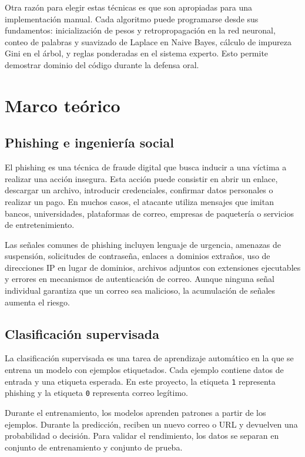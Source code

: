 \documentclass[12pt,letterpaper]{article}
\begin{document}
Otra razón para elegir estas técnicas es que son apropiadas para una implementación manual. Cada algoritmo puede programarse desde sus fundamentos: inicialización de pesos y retropropagación en la red neuronal, conteo de palabras y suavizado de Laplace en Naive Bayes, cálculo de impureza Gini en el árbol, y reglas ponderadas en el sistema experto. Esto permite demostrar dominio del código durante la defensa oral.

\section{Marco teórico}

\subsection{Phishing e ingeniería social}

El phishing es una técnica de fraude digital que busca inducir a una víctima a realizar una acción insegura. Esta acción puede consistir en abrir un enlace, descargar un archivo, introducir credenciales, confirmar datos personales o realizar un pago. En muchos casos, el atacante utiliza mensajes que imitan bancos, universidades, plataformas de correo, empresas de paquetería o servicios de entretenimiento.

Las señales comunes de phishing incluyen lenguaje de urgencia, amenazas de suspensión, solicitudes de contraseña, enlaces a dominios extraños, uso de direcciones IP en lugar de dominios, archivos adjuntos con extensiones ejecutables y errores en mecanismos de autenticación de correo. Aunque ninguna señal individual garantiza que un correo sea malicioso, la acumulación de señales aumenta el riesgo.

\subsection{Clasificación supervisada}

La clasificación supervisada es una tarea de aprendizaje automático en la que se entrena un modelo con ejemplos etiquetados. Cada ejemplo contiene datos de entrada y una etiqueta esperada. En este proyecto, la etiqueta \texttt{1} representa phishing y la etiqueta \texttt{0} representa correo legítimo.

Durante el entrenamiento, los modelos aprenden patrones a partir de los ejemplos. Durante la predicción, reciben un nuevo correo o URL y devuelven una probabilidad o decisión. Para validar el rendimiento, los datos se separan en conjunto de entrenamiento y conjunto de prueba.
\end{document}
